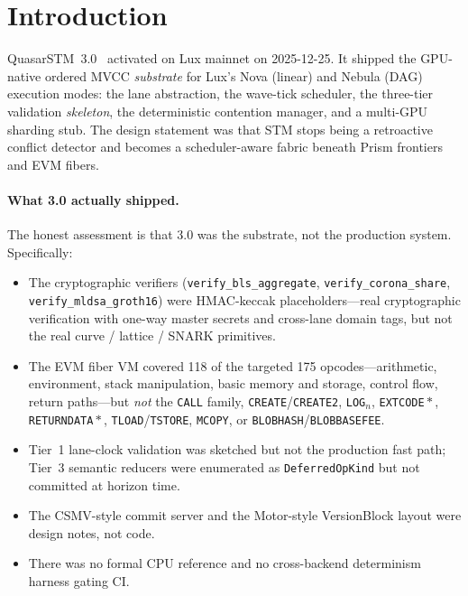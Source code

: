 \section{Introduction}

\label{sec:introduction}

QuasarSTM~3.0~\cite{lp010-quasarstm-3} activated on Lux mainnet on
2025-12-25. It shipped the GPU-native ordered MVCC \emph{substrate} for
Lux's Nova (linear) and Nebula (DAG) execution modes: the lane
abstraction, the wave-tick scheduler, the three-tier validation
\emph{skeleton}, the deterministic contention manager, and a multi-GPU
sharding stub. The design statement was that STM stops being a
retroactive conflict detector and becomes a scheduler-aware fabric
beneath Prism frontiers and EVM fibers.

\paragraph{What 3.0 actually shipped.}
The honest assessment is that 3.0 was the substrate, not the production
system. Specifically:
\begin{itemize}[leftmargin=2em]
\item The cryptographic verifiers (\texttt{verify\_bls\_aggregate},
      \texttt{verify\_corona\_share}, \texttt{verify\_mldsa\_groth16})
      were HMAC-keccak placeholders---real cryptographic verification
      with one-way master secrets and cross-lane domain tags, but not
      the real curve / lattice / SNARK primitives.
\item The EVM fiber VM covered 118 of the targeted 175
      opcodes---arithmetic, environment, stack manipulation, basic
      memory and storage, control flow, return paths---but \emph{not}
      the \texttt{CALL} family, \texttt{CREATE}/\texttt{CREATE2},
      \texttt{LOG}$_n$, \texttt{EXTCODE}$\!*$, \texttt{RETURNDATA}$\!*$,
      \texttt{TLOAD}/\texttt{TSTORE}, \texttt{MCOPY}, or
      \texttt{BLOBHASH}/\texttt{BLOBBASEFEE}.
\item Tier~1 lane-clock validation was sketched but not the production
      fast path; Tier~3 semantic reducers were enumerated as
      \texttt{DeferredOpKind} but not committed at horizon time.
\item The CSMV-style commit server and the Motor-style VersionBlock
      layout were design notes, not code.
\item There was no formal CPU reference and no cross-backend
      determinism harness gating CI.
\end{itemize}

